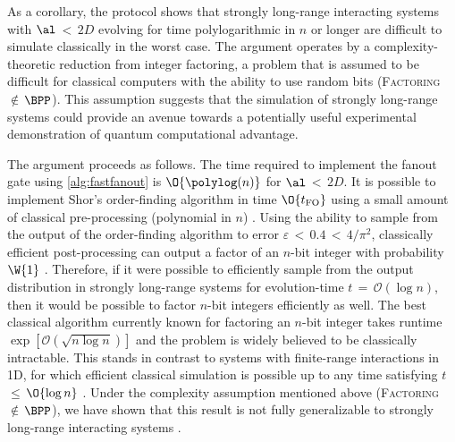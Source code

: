 As
a corollary, the protocol shows that strongly long-range interacting systems with $\al$\,$<$\,$2D$ evolving for time polylogarithmic in $n$ or longer are difficult to simulate classically in the worst case.
The argument operates by a complexity-theoretic reduction from integer factoring, a problem that is assumed to be difficult for classical computers with the ability to use random bits (\textsc{Factoring} $\notin$\,$\BPP$).
This assumption suggests that the simulation of strongly long-range systems could provide an avenue towards a potentially useful experimental demonstration of quantum computational advantage.

The argument proceeds as follows.
The time required to implement the fanout gate using \cref{alg:fastfanout} is $\O{\polylog(n)}$ for $\al$\,$<$\,$2D$.
It is possible to implement Shor's order-finding algorithm in time $\O{t_\mathrm{FO}}$ using a small amount of classical pre-processing (polynomial in $n$) \cite{Cleve2000,Hoyer2005}.
Using the ability to sample from the output of the order-finding algorithm to error $\varepsilon$\,$<$\,$0.4$\,$<$\,$4/\pi^2$, classically efficient post-processing can output a factor of an $n$-bit integer with probability $\W{1}$ \cite{Shor1997}.
Therefore, if it were possible to efficiently sample from the output distribution in strongly long-range systems for evolution-time $t$\,$=$\,$\mathcal{O}(\log n)$, then it would be possible to factor $n$-bit integers efficiently as well.
The best classical algorithm currently known for factoring an $n$-bit integer takes runtime $\exp[\mathcal{O}(\sqrt{n \log n})]$ \cite{Lenstra1992} and the problem is widely believed to be classically intractable.
This stands in contrast to systems with finite-range interactions in 1D, for which efficient classical simulation is possible up to any time satisfying $t$\,$\leq$\,$\O{\log n}$ \cite{Osborne2006}.
Under the complexity assumption mentioned above (\textsc{Factoring} $\notin$\,$\BPP$), we have shown that this result is not fully generalizable to strongly long-range interacting systems \cite{note_takahashi}.



